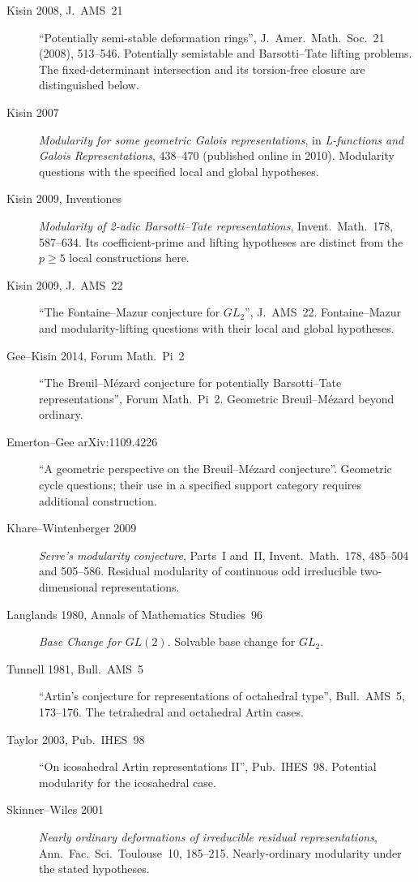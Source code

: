 \begin{description}
\item[Kisin 2008, J.~AMS~21] ``Potentially semi-stable deformation rings'',
J.~Amer.~Math.~Soc.~21 (2008), 513--546.
Potentially semistable and Barsotti--Tate lifting problems. The fixed-determinant intersection and its torsion-free closure are distinguished below.
\item[Kisin 2007]
\emph{Modularity for some geometric Galois representations}, in
\emph{L-functions and Galois Representations}, 438--470
(published online in 2010). Modularity questions with the specified
local and global hypotheses.
\item[Kisin 2009, Inventiones]
\emph{Modularity of 2-adic Barsotti--Tate representations},
Invent.\ Math.~178, 587--634. Its coefficient-prime and lifting
hypotheses are distinct from the $p\ge5$ local constructions here.
\item[Kisin 2009, J.~AMS~22] ``The Fontaine--Mazur conjecture for
\(GL_{2}\)'', J.~AMS~22. Fontaine--Mazur and modularity-lifting questions with their local and global hypotheses.
\item[Gee--Kisin 2014, Forum Math.~Pi~2] ``The Breuil--M{\'e}zard
conjecture for potentially Barsotti--Tate representations'',
Forum Math.~Pi~2. Geometric Breuil--M{\'e}zard beyond ordinary.
\item[Emerton--Gee arXiv:1109.4226] ``A geometric perspective on
the Breuil--M{\'e}zard conjecture''. Geometric cycle questions; their use in a specified support category requires additional construction.
\item[Khare--Wintenberger 2009]
\emph{Serre's modularity conjecture}, Parts~I and~II,
Invent.\ Math.~178, 485--504 and 505--586. Residual modularity of
continuous odd irreducible two-dimensional representations.
\item[Langlands 1980, Annals of Mathematics Studies~96] \emph{Base
Change for \(GL(2)\)}. Solvable base change for \(GL_{2}\).
\item[Tunnell 1981, Bull.~AMS~5] ``Artin's conjecture for
representations of octahedral type'', Bull.~AMS~5, 173--176. The
tetrahedral and octahedral Artin cases.
\item[Taylor 2003, Pub.~IHES~98] ``On icosahedral Artin
representations II'', Pub.~IHES~98. Potential modularity for the
icosahedral case.
\item[Skinner--Wiles 2001]
\emph{Nearly ordinary deformations of irreducible residual
representations}, Ann.\ Fac.\ Sci.\ Toulouse~10, 185--215.
Nearly-ordinary modularity under the stated hypotheses.

\end{description}
